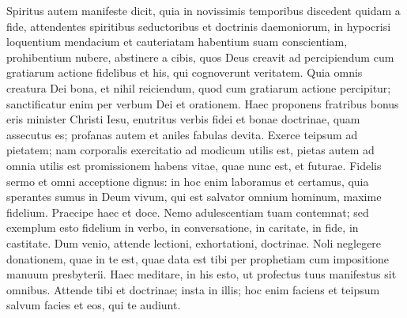 \begin{biblechapter}
\begin{biblechapter}
\begin{biblechapter}
\begin{biblechapter}
\verse Spiritus autem manifeste dicit, quia in novissimis temporibus discedent quidam a fide, attendentes spiritibus seductoribus et doctrinis daemoniorum, 
 \verse in hypocrisi loquentium mendacium et cauteriatam habentium suam conscientiam, 
\verse prohibentium nubere, abstinere a cibis, quos Deus creavit ad percipiendum cum gratiarum actione fidelibus et his, qui cognoverunt veritatem. 
\verse Quia omnis creatura Dei bona, et nihil reiciendum, quod cum gratiarum actione percipitur; 
\verse sanctificatur enim per verbum Dei et orationem.
 \verse Haec proponens fratribus bonus eris minister Christi Iesu, enutritus verbis fidei et bonae doctrinae, quam assecutus es; 
\verse profanas autem et aniles fabulas devita.
 Exerce teipsum ad pietatem; 
\verse nam corporalis exercitatio ad modicum utilis est, pietas autem ad omnia utilis est promissionem habens vitae, quae nunc est, et futurae. 
\verse Fidelis sermo et omni acceptione dignus: 
\verse in hoc enim laboramus et certamus, quia sperantes sumus in Deum vivum, qui est salvator omnium hominum, maxime fidelium. 
\verse Praecipe haec et doce.
 \verse Nemo adulescentiam tuam contemnat; sed exemplum esto fidelium in verbo, in conversatione, in caritate, in fide, in castitate. 
\verse Dum venio, attende lectioni, exhortationi, doctrinae. 
\verse Noli neglegere donationem, quae in te est, quae data est tibi per prophetiam cum impositione manuum presbyterii. 
\verse Haec meditare, in his esto, ut profectus tuus manifestus sit omnibus. 
\verse Attende tibi et doctrinae; insta in illis; hoc enim faciens et teipsum salvum facies et eos, qui te audiunt.
 

\end{biblechapter}
\end{biblechapter}
\end{biblechapter}
\end{biblechapter}
